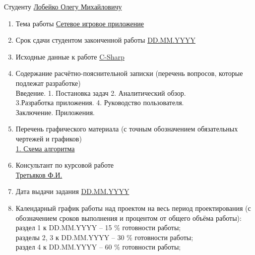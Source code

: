 \documentclass[14pt,a4paper]{extreport}
\begin{document}
	\endcenter
	\raggedright
	Студенту \underline{Лобейко Олегу Михайловичу}\\
	\begin{enumerate}
	\item Тема работы \underline{Сетевое игровое приложение}\\ 
	\item Срок сдачи студентом законченной работы \underline{DD.MM.YYYY}
	\item Исходные данные к работе \underline{C-Sharp}
	\item Содержание расчётно-пояснительной записки (перечень вопросов, которые подлежат разработке)\\
	\underline{\hspace*{16cm}}\hspace*{-16cm}Введение. 1. Постановка задач 2. Аналитический обзор. \\
	\underline{\hspace*{16cm}}\hspace*{-16cm}3.Разработка приложения. 4. Руководство пользователя.\\
	\underline{\hspace*{16cm}}\hspace*{-16cm}Заключение. Приложения.
	\item Перечень графического материала (с точным обозначением обязательных чертежей и графиков)\\
	\underline{1. Схема алгоритма}
	\item Консультант по курсовой работе\\
	\underline{Третьяков Ф.И.}  
	\item Дата выдачи задания \underline{DD.MM.YYYY}
	\item Календарный график работы над проектом на весь период проектирования (с обозначением сроков выполнения и процентом от общего объёма работы):\\
	\underline{\hspace*{16cm}}\hspace*{-16cm}раздел 1 к DD.MM.YYYY – 15 \% готовности работы;\\  
	\underline{\hspace*{16cm}}\hspace*{-16cm}разделы 2, 3 к DD.MM.YYYY – 30 \% готовности работы;\\ 
	\underline{\hspace*{16cm}}\hspace*{-16cm}раздел 4 к DD.MM.YYYY – 60 \% готовности работы;\\

\end{enumerate}
\end{document}
